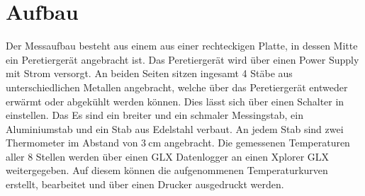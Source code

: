 \section{Aufbau}
Der Messaufbau besteht aus einem aus einer rechteckigen Platte, in dessen Mitte
 ein Peretiergerät angebracht ist. Das Peretiergerät wird über einen Power Supply
  mit Strom versorgt. An beiden Seiten sitzen ingesamt 4 Stäbe aus unterschiedlichen
  Metallen angebracht, welche über das Peretiergerät entweder erwärmt oder abgekühlt
   werden können. Dies lässt sich über einen Schalter in einstellen. Das
   Es sind ein breiter und ein schmaler Messingstab, ein
   Aluminiumstab und ein Stab aus Edelstahl verbaut. An jedem Stab sind zwei
   Thermometer im Abstand von $\SI{3}{\centi\meter}$ angebracht. Die gemessenen
   Temperaturen aller 8 Stellen werden über einen GLX Datenlogger an einen Xplorer GLX
   weitergegeben. Auf diesem können die aufgenommenen Temperaturkurven erstellt,
   bearbeitet und über einen Drucker ausgedruckt werden.

